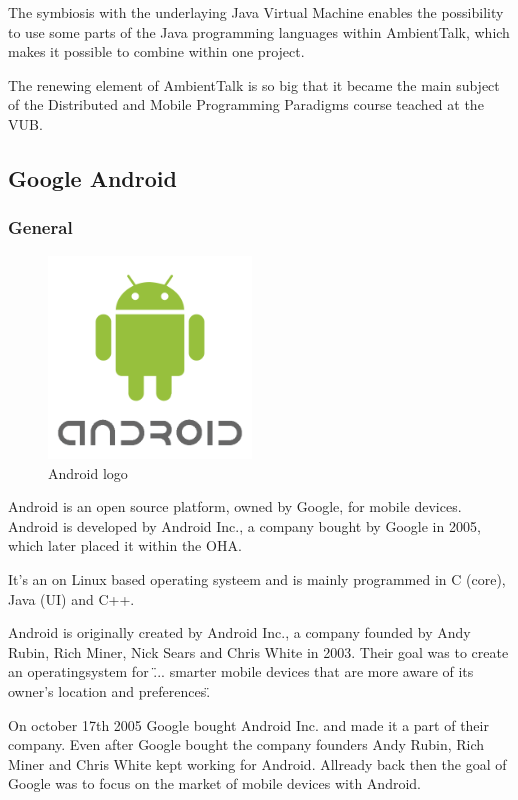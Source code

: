 \documentclass[a4paper,12pt]{report}
\begin{document}
The symbiosis with the underlaying Java Virtual Machine enables the possibility to use some parts of the Java programming languages within AmbientTalk, which makes it possible to combine within
one project.

The renewing element of AmbientTalk is so big that it became the main subject of the Distributed and Mobile Programming Paradigms course teached at the VUB.
\subsection{Google Android}



\subsubsection{General}
\begin{figure}
  \begin{center}
    \includegraphics[width=0.48\textwidth]{images/android.png}
  \end{center}
  \caption{Android logo}
\end{figure}
Android is an open source platform, owned by Google, for mobile devices. Android is developed by Android Inc., a company bought by Google in 2005, which later placed it 
within the OHA. 

It's an on Linux based operating systeem and is mainly programmed in C (core), Java (UI) and C++.

Android is originally created by Android Inc., a company founded by Andy Rubin, Rich Miner, Nick Sears and Chris White in 2003. Their goal was to create an operatingsystem
for \" ... smarter mobile devices that are more aware of its owner's location and preferences\". 

On october 17th 2005 Google bought Android Inc. and made it a part of their company. Even after Google bought the company founders Andy Rubin, Rich Miner and Chris White
kept working for Android. Allready back then the goal of Google was to focus on the market of mobile devices with Android.
\end{document}
